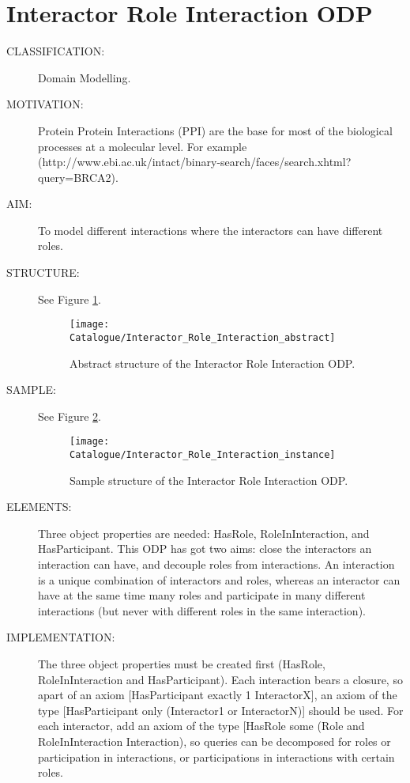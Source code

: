  \section{Interactor Role Interaction ODP}\begin{description}
\item [CLASSIFICATION:] Domain Modelling.

\item [MOTIVATION:] Protein Protein Interactions (PPI) are the base for most of the biological processes at a molecular level. For example (http://www.ebi.ac.uk/intact/binary-search/faces/search.xhtml?query=BRCA2).

\item [AIM:] To model different interactions where the interactors can have different roles.

\item [STRUCTURE:] See Figure \ref{odp:Interactor_Role_Interaction_abstract}.
\begin{figure}[]\centering\texttt{[image: Catalogue/Interactor\_Role\_Interaction\_abstract]}\caption{\label{odp:Interactor_Role_Interaction_abstract} Abstract structure of the Interactor Role Interaction ODP.}\end{figure}

\item [SAMPLE:] See Figure \ref{odp:Interactor_Role_Interaction_instance}.
\begin{figure}[]\centering\texttt{[image: Catalogue/Interactor\_Role\_Interaction\_instance]}\caption{\label{odp:Interactor_Role_Interaction_instance} Sample structure of the Interactor Role Interaction ODP.}\end{figure}

\item [ELEMENTS:] Three object properties are needed: HasRole, RoleInInteraction, and HasParticipant. This ODP has got two aims: close the interactors an interaction can have, and decouple roles from interactions. An interaction is a unique combination of interactors and roles, whereas an interactor can have at the same time many roles and participate in many different interactions (but never with different roles in the same interaction).

\item [IMPLEMENTATION:] The three object properties must be created first (HasRole, RoleInInteraction and HasParticipant). Each interaction bears a closure, so apart of an axiom [HasParticipant exactly 1 InteractorX], an axiom of the type [HasParticipant only (Interactor1 or InteractorN)] should be used. For each interactor, add an axiom of the type [HasRole some (Role and RoleInInteraction Interaction), so queries can be decomposed for roles or participation in interactions, or participations in interactions with certain roles.


\end{description}
